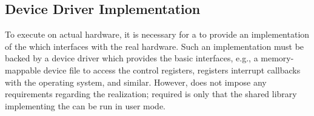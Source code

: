 \subsection{Device Driver Implementation}\label{sec:pi-dd}%
To execute on actual hardware, it is necessary for a  to provide an implementation of the  which interfaces with the real hardware.
Such an implementation must be backed by a device driver which provides the basic interfaces, e.g., a memory-mappable device file to access the control registers, registers interrupt callbacks with the operating system, and similar.
However, \tapasco{} does not impose any requirements regarding the realization; required is only that the shared library implementing the  can be run in user mode.
